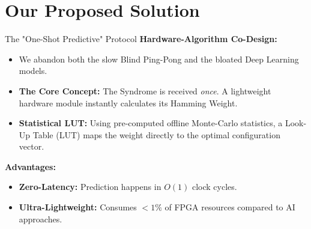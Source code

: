 \documentclass[t, aspectratio=169]{beamer}
\begin{document}
	\section{Our Proposed Solution}
	\useStyleLogoOnly 
	\useThickBar      
	\begin{frame}{The "One-Shot Predictive" Protocol}
		\textbf{Hardware-Algorithm Co-Design:}
        \begin{itemize}
            \item We abandon both the slow Blind Ping-Pong and the bloated Deep Learning models.
            \item \textbf{The Core Concept:} The Syndrome is received \textit{once}. A lightweight hardware module instantly calculates its Hamming Weight.
            \item \textbf{Statistical LUT:} Using pre-computed offline Monte-Carlo statistics, a Look-Up Table (LUT) maps the weight directly to the optimal configuration vector.
        \end{itemize}
        
        \vspace{1em}
        \textbf{Advantages:}
        \begin{itemize}
            \item \textbf{Zero-Latency:} Prediction happens in $O(1)$ clock cycles.
            \item \textbf{Ultra-Lightweight:} Consumes $< 1\%$ of FPGA resources compared to AI approaches.
        \end{itemize}
	\end{frame}
	
\end{document}
